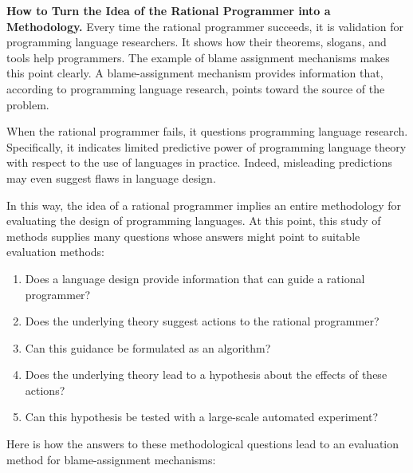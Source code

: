 

\vspace{1.5em}
\textbf{How to Turn the Idea of the Rational Programmer into a Methodology.}
Every time the rational programmer succeeds, it is validation for programming
language researchers. It shows how their theorems, slogans, and tools help
programmers. The example of blame assignment mechanisms makes this point
clearly. A blame-assignment mechanism provides information that, according to
programming language research, points toward the source of the problem.

When the rational programmer fails, it questions programming
language research. Specifically, it indicates limited predictive
power of programming language theory with respect to the use of languages in
practice. Indeed, misleading predictions may even suggest flaws in language design.

In this way, the idea of a rational programmer implies an entire methodology for
evaluating the design of programming languages. At this point, this study of
methods supplies many questions whose answers might point to suitable evaluation
methods: 

\begin{enumerate} 

\item Does a language design provide information that can guide a
 rational programmer?

\item Does the underlying theory suggest actions to the rational programmer?

\item Can this guidance be formulated as an algorithm?

\item Does the underlying theory lead to a hypothesis about the effects of
 these actions? 

\item Can this hypothesis be tested with a large-scale automated experiment?

\end{enumerate}

Here is how the answers to these methodological questions lead to an evaluation
method for blame-assignment mechanisms: 

